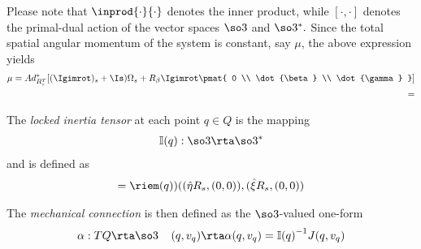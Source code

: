 \documentclass[11pt]{article}                %
\begin{document}
	       Please note that $\inprod{\cdot}{\cdot}$ denotes the inner product, while 
	       $[\cdot, \cdot]$ denotes the primal-dual action of the vector spaces $\so3$ and
	       $\so3^*.$
	       Since the total spatial angular momentum of the system is constant, say $\mu$, 
	       the above expression
	       yields
	       \begin{align}
	       \mu = Ad_{R_s^T}^* [ (\Igimrot)_s + \Is) \Omega_s + R_{\beta} \Igimrot \pmat{ 0  \\  \dot{\beta}
	                                                      \\  \dot{\gamma} }   ]   \\
	                = 
	       \end{align}
	 	\item 
	 	   The {\it locked inertia tensor} at each point $q \in Q$ is the mapping 
	      \begin{align}  \mathbb I (q): \so3 \rta \so3^* \end{align}
	      and is defined as  
	      \begin{align}  [ \mathbb I(q) \eta, \xi ] = \riem (q)) ((\hat{\eta} R_s , (0,0)),
	                                                           (\hat{\xi} R_s , (0, 0))       
	      \end{align}
	      \item 
	      The {\it mechanical connection} is then defined as  the $\so3$-valued one-form	
	      \begin{align}
	      		\alpha: TQ \rta \so3 \;\;\;\; (q, v_q) \rta \alpha(q, v_q) = {\mathbb I(q)}^{-1} J(q,v_q)
	      \end{align}
	      	\ei
	                   
\end{document}
